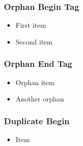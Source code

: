 \documentclass{beamer}
\begin{document}
\begin{frame}
\frametitle{Orphan Begin Tag}
\begin{itemize}
  \item First item
  \item Second item
\end{itemize}
\end{frame}

\begin{frame}
\frametitle{Orphan End Tag}
\begin{itemize}
  \item Orphan item
  \item Another orphan
\end{itemize}
\end{frame}

\begin{frame}
\frametitle{Duplicate Begin}
\begin{itemize}
  \item Item
\end{itemize}
\end{frame}
\end{document}
